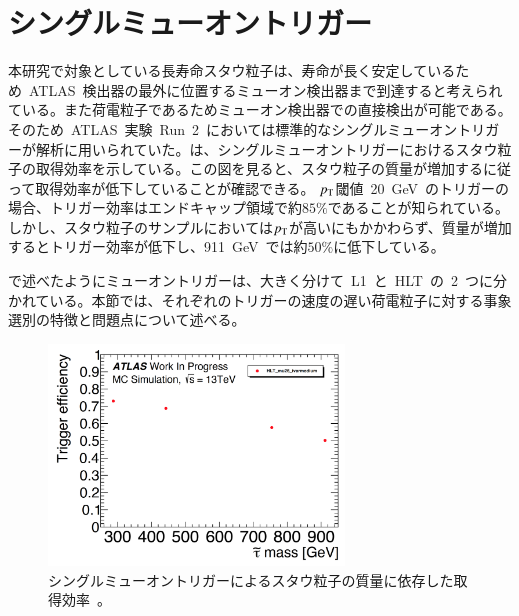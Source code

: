 \section{シングルミューオントリガー}
\label{sec:single}
本研究で対象としている長寿命スタウ粒子は、寿命が長く安定しているため~ATLAS~検出器の最外に位置するミューオン検出器まで到達すると考えられている。また荷電粒子であるためミューオン検出器での直接検出が可能である。そのため~ATLAS~実験~Run~2~においては標準的なシングルミューオントリガーが解析に用いられていた。は、シングルミューオントリガーにおけるスタウ粒子の取得効率を示している。この図を見ると、スタウ粒子の質量が増加するに従って取得効率が低下していることが確認できる。
$p_{\rm{T}}$閾値~20~GeV~のトリガーの場合、トリガー効率はエンドキャップ領域で約$85\%$であることが知られている。しかし、スタウ粒子のサンプルにおいては$p_{\rm{T}}$が高いにもかかわらず、質量が増加するとトリガー効率が低下し、911~GeV~では約$50\%$に低下している。

で述べたようにミューオントリガーは、大きく分けて~L1~と~HLT~の~2~つに分かれている。本節では、それぞれのトリガーの速度の遅い荷電粒子に対する事象選別の特徴と問題点について述べる。

\begin{figure}[tbp]
        \centering   
        \includegraphics[width=0.7\textwidth,page=1]{img/pdf3/sumi.pdf}
        \caption[シングルミューオントリガーによるスタウ粒子の質量に依存した取得効率]{シングルミューオントリガーによるスタウ粒子の質量に依存した取得効率~\cite{MT:01}。}
        \label{fig:sumi1}
\end{figure}

